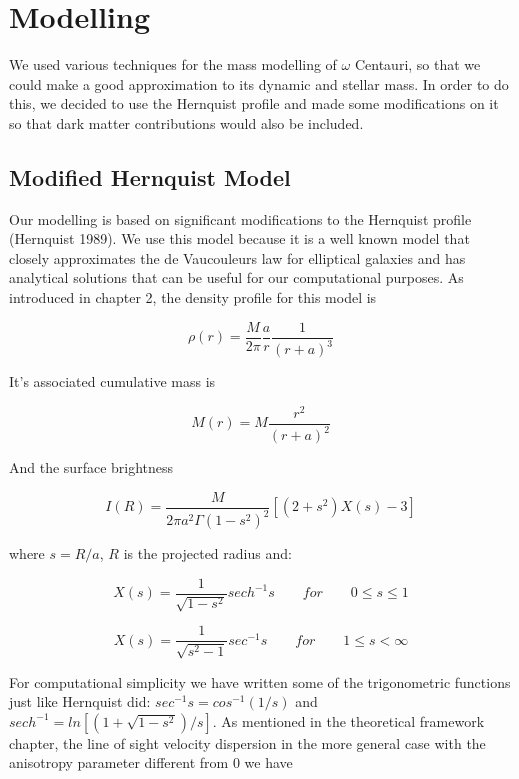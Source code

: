 \chapter{Modelling}

We used various techniques for the mass modelling of $\omega$ Centauri, so that we could make a good approximation to its dynamic and stellar mass. In order to do this, we decided to use the Hernquist profile and made some modifications on it so that dark matter contributions would also be included.  

\section{Modified Hernquist Model}

Our modelling is based on significant modifications to the Hernquist profile (Hernquist 1989).  We use this model because it is a well known model that closely approximates the de Vaucouleurs law for elliptical galaxies and has analytical solutions that can be useful for our computational purposes. As introduced in chapter 2, the density profile for this model is

\begin{equation}
\rho(r)=\frac{M}{2\pi}\frac{a}{r}\frac{1}{\left(r+a\right)^{3}}
\end{equation}

It's associated cumulative mass is

\begin{equation}
M(r)=M\frac{r^{2}}{(r+a)^{2}}
\end{equation}
 
And the surface brightness 
 
 \begin{equation}
 I(R)=\frac{M}{2\pi a^{2}\Gamma\left(1-s^{2}\right)^{2}}\left[\left(2+s^{2}\right)X(s)-3\right]
 \end{equation}
 
where $s=R/a$, $R$ is the projected radius and:

\begin{equation}
X(s)=\frac{1}{\sqrt{1-s^{2}}}sech^{-1}s\qquad for\qquad0\leq s\leq1
\end{equation}

\begin{equation}
X(s)=\frac{1}{\sqrt{s^{2}-1}}sec^{-1}s\qquad for\qquad1\leq s<\infty
\end{equation}

For computational simplicity we have written some of the trigonometric functions just like Hernquist did: $sec^{-1}s = cos^{-1}(1/s)$ and $sech^{-1} = ln[(1+\sqrt{1-s^{2}})/s]$. As mentioned in the theoretical framework chapter, the line of sight velocity dispersion in the more general case with the anisotropy parameter different from 0 we have

